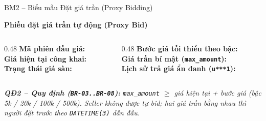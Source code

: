 \documentclass[aspectratio=169, 10pt]{beamer}
\begin{document}
\begin{frame}{BM2 -- Biểu mẫu Đặt giá trần (Proxy Bidding)}
    \begin{block}{\centering \textbf{Phiếu đặt giá trần tự động (Proxy Bid)}}
        \vspace{0.15cm}
        \begin{columns}[t]
            \begin{column}{0.48\textwidth}
                \textbf{Mã phiên đấu giá:} \hrulefill \\[0.25cm]
                \textbf{Giá hiện tại công khai:} \hrulefill \\[0.25cm]
                \textbf{Trạng thái giá sàn:} \hrulefill
            \end{column}
            \begin{column}{0.48\textwidth}
                \textbf{Bước giá tối thiểu theo bậc:} \hrulefill \\[0.25cm]
                \textbf{Giá trần bí mật (\texttt{max\_amount}):} \hrulefill \\[0.25cm]
                \textbf{Lịch sử trả giá ẩn danh (\texttt{u***1}):} \hrulefill
            \end{column}
        \end{columns}
        \vspace{0.15cm}
    \end{block}
    \vspace{0.25cm}
    \centering
    \textit{\small \textbf{QĐ2 -- Quy định (\texttt{BR-03..BR-08}):} \texttt{max\_amount} $\ge$ giá hiện tại + bước giá (bậc 5k / 20k / 100k / 500k). Seller không được tự bid; hai giá trần bằng nhau thì người đặt trước theo \texttt{DATETIME(3)} dẫn đầu.}
\end{frame}
\end{document}
